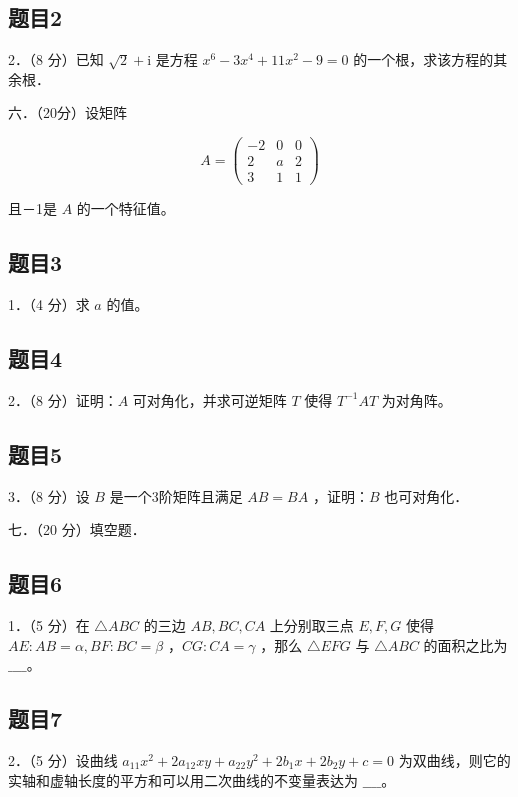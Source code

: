\documentclass{article}
\begin{document}
\subsection{题目2}
2．（8 分）已知 \(\sqrt{2}+\mathrm{i}\) 是方程 \(x^{6}-3 x^{4}+11 x^{2}-9=0\) 的一个根，求该方程的其余根．

六．（20分）设矩阵

\[
A=\left(\begin{array}{ccc}
-2 & 0 & 0 \\
2 & a & 2 \\
3 & 1 & 1
\end{array}\right)
\]

且－1是 \(A\) 的一个特征值。\\

\subsection{题目3}
1．（4 分）求 \(a\) 的值。\\

\subsection{题目4}
2．（8 分）证明：\(A\) 可对角化，并求可逆矩阵 \(T\) 使得 \(T^{-1} A T\) 为对角阵。\\

\subsection{题目5}
3．（8 分）设 \(B\) 是一个3阶矩阵且满足 \(A B=B A\) ，证明：\(B\) 也可对角化．

七．（20 分）填空题．\\

\subsection{题目6}
1．（5 分）在 \(\triangle A B C\) 的三边 \(A B, B C, C A\) 上分别取三点 \(E, F, G\) 使得 \(A E: A B=\alpha, B F: B C=\beta\) ，\(C G: C A=\gamma\) ，那么 \(\triangle E F G\) 与 \(\triangle A B C\) 的面积之比为 \(\_\_\_\_\)。\\

\subsection{题目7}
2．（5 分）设曲线 \(a_{11} x^{2}+2 a_{12} x y+a_{22} y^{2}+2 b_{1} x+2 b_{2} y+c=0\) 为双曲线，则它的实轴和虚轴长度的平方和可以用二次曲线的不变量表达为 \(\_\_\_\_\)。\\
\end{document}
